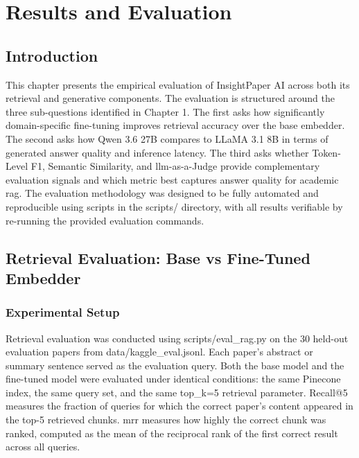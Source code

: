 \chapter{Results and Evaluation}

\section{Introduction}

This chapter presents the empirical evaluation of InsightPaper AI across both its retrieval and generative components. The evaluation is structured around the three sub-questions identified in Chapter 1. The first asks how significantly domain-specific fine-tuning improves retrieval accuracy over the base embedder. The second asks how Qwen 3.6 27B compares to LLaMA 3.1 8B in terms of generated answer quality and inference latency. The third asks whether Token-Level F1, Semantic Similarity, and \gls{llm}-as-a-Judge provide complementary evaluation signals and which metric best captures answer quality for academic \gls{rag}.
\newline \newline The evaluation methodology was designed to be fully automated and reproducible using scripts in the scripts/ directory, with all results verifiable by re-running the provided evaluation commands.

\section{Retrieval Evaluation: Base vs Fine-Tuned Embedder}

\subsection{Experimental Setup}

Retrieval evaluation was conducted using scripts/eval\_rag.py on the 30 held-out evaluation papers from data/kaggle\_eval.jsonl. Each paper's abstract or summary sentence served as the evaluation query. Both the base model and the fine-tuned model were evaluated under identical conditions: the same Pinecone index, the same query set, and the same top\_k=5 retrieval parameter.
\newline \newline Recall@5 measures the fraction of queries for which the correct paper's content appeared in the top-5 retrieved chunks. \gls{mrr} measures how highly the correct chunk was ranked, computed as the mean of the reciprocal rank of the first correct result across all queries.

